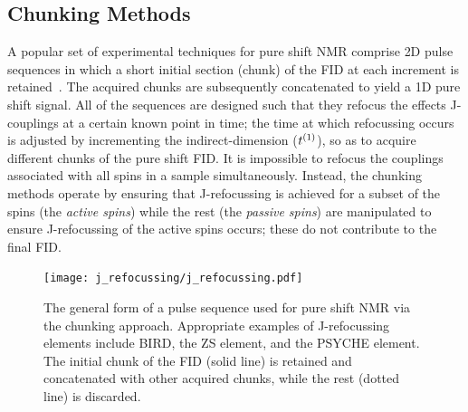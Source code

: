 \subsection{Chunking Methods}
A popular set of experimental techniques for pure shift \ac{NMR} comprise
\ac{2D} pulse sequences in which a short initial section (chunk) of the
\ac{FID} at each increment is retained~\cite{Adams2014}. The acquired chunks are
subsequently concatenated to yield a \ac{1D} pure shift signal.  All of the
sequences are designed such that they refocus the effects J-couplings at a
certain known point in time;
the time at which refocussing occurs is adjusted by incrementing
the indirect-dimension ($t^{(1)}$), so as to acquire
different chunks of the pure shift \ac{FID}. It is impossible to refocus the
couplings associated with all spins in a sample simultaneously. Instead, the
chunking methods operate by ensuring that J-refocussing is achieved for a
subset of the spins (the \emph{active spins}) while the rest (the \emph{passive
spins}) are manipulated to ensure J-refocussing of the active spins occurs;
these do not contribute to the final \ac{FID}.

\begin{figure}
    \centering
    \texttt{[image: j\_refocussing/j\_refocussing.pdf]}
    \caption[
        The general form of a pulse sequence used for pure shift \acs{NMR}
        using the chunking approach.
    ]{
        The general form of a pulse sequence used for pure shift \acs{NMR}
        via the chunking approach. Appropriate examples of J-refocussing
        elements include \acs{BIRD}, the \acl{ZS} element, and the
        \acs{PSYCHE} element. The initial chunk of the \ac{FID} (solid
        line) is retained and concatenated with other acquired chunks,
        while the rest (dotted line) is discarded.
    }
    \label{fig:j-refocussing}
\end{figure}
\makeatletter
{}
\makeatother

